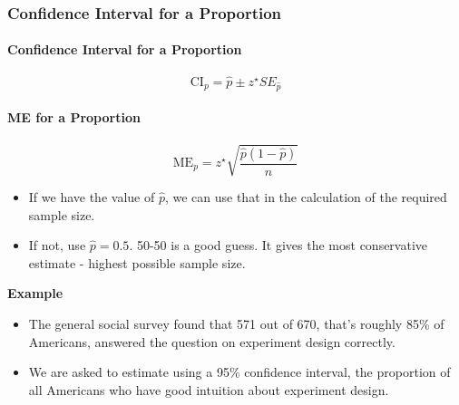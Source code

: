 \documentclass[]{book}
\providecommand{\tightlist}{%
  \setlength{\itemsep}{0pt}\setlength{\parskip}{0pt}}
\let\oldparagraph\paragraph
\renewcommand{\paragraph}[1]{\oldparagraph{#1}\mbox{}}
\begin{document}
\hypertarget{confidence-interval-for-a-proportion}{%
\subsubsection*{Confidence Interval for a Proportion}\label{confidence-interval-for-a-proportion}}

\hypertarget{confidence-interval-for-a-proportion-1}{%
\paragraph{Confidence Interval for a Proportion}\label{confidence-interval-for-a-proportion-1}}

\[
\text{CI}_{p} = \hat{p} \pm z^\star SE_{\hat{p}}
\]

\hypertarget{me-for-a-proportion}{%
\paragraph{ME for a Proportion}\label{me-for-a-proportion}}

\[
\text{ME}_{p} = z^\star \sqrt{\frac{\hat{p}(1-\hat{p})}{n}}
\]

\begin{itemize}
\tightlist
\item
  If we have the value of \(\hat{p}\), we can use that in the calculation of the required sample size.
\item
  If not, use \(\hat{p} = 0.5\). 50-50 is a good guess. It
  gives the most conservative estimate - highest possible sample size.
\end{itemize}

\textbf{Example}

\begin{itemize}
\tightlist
\item
  The general social survey found that 571 out of 670, that's roughly 85\% of Americans, answered the question on experiment design correctly.
\item
  We are asked to estimate using a 95\% confidence interval, the proportion of all Americans who have good intuition about experiment design.
\end{itemize}
\end{document}
